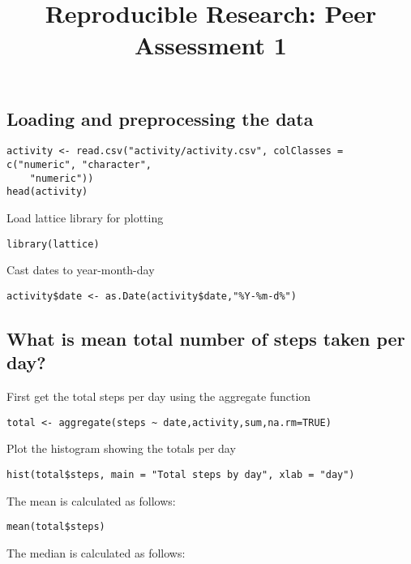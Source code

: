 \documentclass[
]{article}
\title{Reproducible Research: Peer Assessment 1}
\author{}
\date{\vspace{-2.5em}}
\begin{document}
\maketitle

\hypertarget{loading-and-preprocessing-the-data}{%
\subsection{Loading and preprocessing the
data}\label{loading-and-preprocessing-the-data}}

\begin{verbatim}
activity <- read.csv("activity/activity.csv", colClasses = c("numeric", "character", 
    "numeric"))
head(activity)
\end{verbatim}

Load lattice library for plotting

\begin{verbatim}
library(lattice)
\end{verbatim}

Cast dates to year-month-day

\begin{verbatim}
activity$date <- as.Date(activity$date,"%Y-%m-d%")
\end{verbatim}

\hypertarget{what-is-mean-total-number-of-steps-taken-per-day}{%
\subsection{What is mean total number of steps taken per
day?}\label{what-is-mean-total-number-of-steps-taken-per-day}}

First get the total steps per day using the aggregate function

\begin{verbatim}
total <- aggregate(steps ~ date,activity,sum,na.rm=TRUE)
\end{verbatim}

Plot the histogram showing the totals per day

\begin{verbatim}
hist(total$steps, main = "Total steps by day", xlab = "day")
\end{verbatim}

The mean is calculated as follows:

\begin{verbatim}
mean(total$steps)
\end{verbatim}

The median is calculated as follows:
\end{document}
